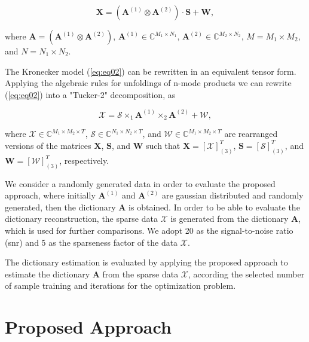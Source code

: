 \documentclass[conference]{IEEEtran}
\begin{document}
\begin{equation}\label{eq:eq02}
\boldsymbol{X} = (\boldsymbol{A}^{(1)} \otimes \boldsymbol{A}^{(2)}) \cdot \boldsymbol{S} + \boldsymbol{W},
\end{equation}

where $\boldsymbol{A} = (\boldsymbol{A}^{(1)} \otimes \boldsymbol{A}^{(2)})$, $\boldsymbol{A}^{(1)} \in \mathbb{C}^{M_1 \times N_1}$, $\boldsymbol{A}^{(2)} \in \mathbb{C}^{M_2 \times N_2}$, $M = M_1 \times M_2$, and $N = N_1 \times N_2$.

The Kronecker model (\ref{eq:eq02}) can be rewritten in an equivalent tensor form. Applying the algebraic rules for unfoldings of n-mode products \cite{roemer2014tensor} we can rewrite (\ref{eq:eq02}) into a "Tucker-2" decomposition, as

\begin{equation}\label{eq:eq03}
\boldsymbol{\mathcal{X}} = \boldsymbol{\mathcal{S}} \times_1 \boldsymbol{A}^{(1)} \times_2 \boldsymbol{A}^{(2)} +  \boldsymbol{\mathcal{W}},
\end{equation}

where $\boldsymbol{\mathcal{X}} \in \mathbb{C}^{M_1 \times M_2 \times T}$, $\boldsymbol{\mathcal{S}} \in \mathbb{C}^{N_1 \times N_2 \times T}$, and $\boldsymbol{\mathcal{W}} \in \mathbb{C}^{M_1 \times M_2 \times T}$ are rearranged versions of the matrices $\boldsymbol{X}$, $\boldsymbol{S}$, and $\boldsymbol{W}$ such that $\boldsymbol{X} = [\boldsymbol{\mathcal{X}}]_{(3)}^T$, $\boldsymbol{S} = [\boldsymbol{\mathcal{S}}]_{(3)}^T$, and $\boldsymbol{W} = [\boldsymbol{\mathcal{W}}]_{(3)}^T$, respectively.

We consider a randomly generated data in order to evaluate the proposed approach, where initially $\boldsymbol{A}^{(1)}$ and $\boldsymbol{A}^{(2)}$ are gaussian distributed and randomly generated, then the dictionary $\boldsymbol{A}$ is obtained. In order to be able to evaluate the dictionary reconstruction, the sparse data $\boldsymbol{\mathcal{X}}$ is generated from the dictionary $\boldsymbol{A}$, which is used for further comparisons. We adopt 20 as the signal-to-noise ratio (snr) and 5 as the sparseness factor of the data $\boldsymbol{\mathcal{X}}$. 

The dictionary estimation is evaluated by applying the proposed approach to estimate the dictionary $\boldsymbol{A}$ from the sparse data $\boldsymbol{\mathcal{X}}$, according the selected number of sample training and iterations for the optimization problem.

\section{Proposed Approach}
\end{document}
